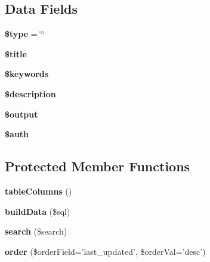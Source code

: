 \subsection*{Data Fields}
\begin{DoxyCompactItemize}
\item 
\hypertarget{class_table_controller_a9a4a6fba2208984cabb3afacadf33919}{
{\bfseries \$type} = \char`\"{}\char`\"{}}
\label{class_table_controller_a9a4a6fba2208984cabb3afacadf33919}

\item 
\hypertarget{class_controller_ada57e7bb7c152edad18fe2f166188691}{
{\bfseries \$title}}
\label{class_controller_ada57e7bb7c152edad18fe2f166188691}

\item 
\hypertarget{class_controller_a9fbd95bfcdf27d802a8c7938529a61ba}{
{\bfseries \$keywords}}
\label{class_controller_a9fbd95bfcdf27d802a8c7938529a61ba}

\item 
\hypertarget{class_controller_a87b032cba06009e3467abf1c8018d960}{
{\bfseries \$description}}
\label{class_controller_a87b032cba06009e3467abf1c8018d960}

\item 
\hypertarget{class_controller_a73004ce9cd673c1bfafd1dc351134797}{
{\bfseries \$output}}
\label{class_controller_a73004ce9cd673c1bfafd1dc351134797}

\item 
\hypertarget{class_controller_a20d7415a9c3391b32d7fe2136fce6e2c}{
{\bfseries \$auth}}
\label{class_controller_a20d7415a9c3391b32d7fe2136fce6e2c}

\end{DoxyCompactItemize}
\subsection*{Protected Member Functions}
\begin{DoxyCompactItemize}
\item 
\hypertarget{class_assets_controller_a70e5cc5fdb2be40dd13850769aedaa5f}{
{\bfseries tableColumns} ()}
\label{class_assets_controller_a70e5cc5fdb2be40dd13850769aedaa5f}

\item 
\hypertarget{class_assets_controller_ae80210635040a4898e7622e78be42b37}{
{\bfseries buildData} (\$sql)}
\label{class_assets_controller_ae80210635040a4898e7622e78be42b37}

\item 
\hypertarget{class_table_controller_a0d624b549023221829714196e71f38da}{
{\bfseries search} (\$search)}
\label{class_table_controller_a0d624b549023221829714196e71f38da}

\item 
\hypertarget{class_table_controller_aaa6b1813bb87dfa5e9d2cb37ecf4fdf0}{
{\bfseries order} (\$orderField='last\_\-updated', \$orderVal='desc')}
\label{class_table_controller_aaa6b1813bb87dfa5e9d2cb37ecf4fdf0}

\end{DoxyCompactItemize}
